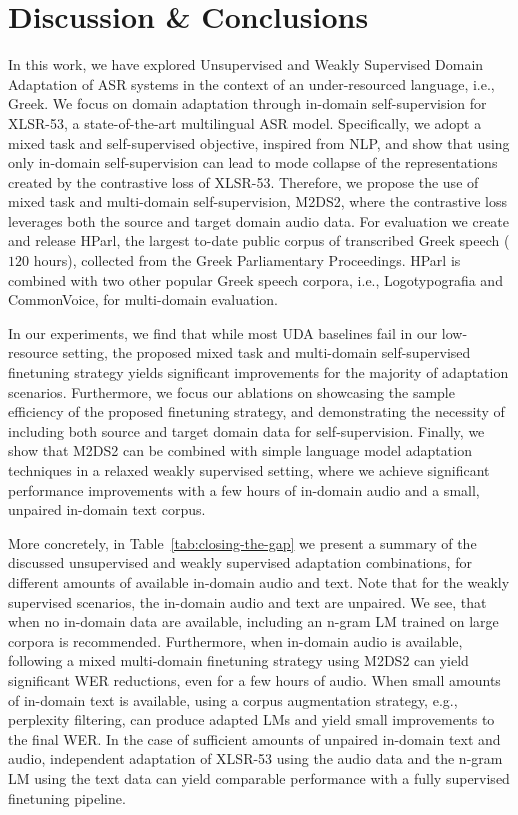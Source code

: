 \documentclass[journal]{IEEEtran}
\begin{document}
\section{Discussion \& Conclusions}


In this work, we have explored Unsupervised and Weakly Supervised Domain Adaptation of ASR systems in the context of an under-resourced language, i.e., Greek. We focus on domain adaptation through in-domain self-supervision for XLSR-53, a state-of-the-art multilingual ASR model. Specifically, we adopt a mixed task and self-supervised objective, inspired from NLP, and show that using only in-domain self-supervision can lead to mode collapse of the representations created by the contrastive loss of XLSR-53. Therefore, we propose the use of mixed task and multi-domain self-supervision, M2DS2, where the contrastive loss leverages both the source and target domain audio data. For evaluation we create and release HParl, the largest to-date public corpus of transcribed Greek speech ($120$ hours), collected from the Greek Parliamentary Proceedings. HParl is combined with two other popular Greek speech corpora, i.e., Logotypografia and CommonVoice, for multi-domain evaluation.

In our experiments, we find that while most UDA baselines fail in our low-resource setting, the proposed mixed task and multi-domain self-supervised finetuning strategy yields significant improvements for the majority of adaptation scenarios. Furthermore, we focus our ablations on showcasing the sample efficiency of the proposed finetuning strategy, and demonstrating the necessity of including both source and target domain data for self-supervision. Finally, we show that M2DS2 can be combined with simple language model adaptation techniques in a relaxed weakly supervised setting, where we achieve significant performance improvements with a few hours of in-domain audio and a small, unpaired in-domain text corpus.


More concretely, in Table~\ref{tab:closing-the-gap} we present a summary of the discussed  unsupervised and weakly supervised adaptation combinations, for different amounts of available in-domain audio and text. Note that for the weakly supervised scenarios, the in-domain audio and text are unpaired. We see, that when no in-domain data are available, including an n-gram LM trained on large corpora is recommended. Furthermore, when in-domain audio is available, following a mixed multi-domain finetuning strategy using M2DS2 can yield significant WER reductions, even for a few hours of audio.
When small amounts of in-domain text is available, using a corpus augmentation strategy, e.g., perplexity filtering, can produce adapted LMs and yield small improvements to the final WER.
In the case of sufficient amounts of unpaired in-domain text and audio, independent adaptation of XLSR-53 using the audio data and the n-gram LM using the text data can yield comparable performance with a fully supervised finetuning pipeline.
\end{document}
